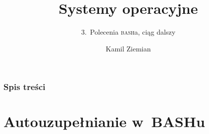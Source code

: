 \documentclass[10pt,t]{beamer}
\title{Systemy operacyjne}
\subtitle{3.~Polecenia \textsc{bash}a, ciąg dalszy}
\author{Kamil Ziemian \\
  \email}
\begin{document}





\RaggedRight





\maketitle





\begin{frame}
  \frametitle{Spis treści}


  \tableofcontents

\end{frame}




















\section{Autouzupełnianie w~BASHu}
\end{document}

